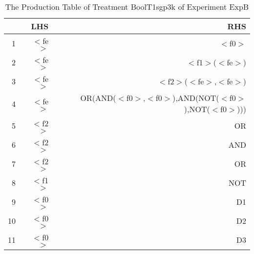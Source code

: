 \begin{table}[ht]
\centering
\begin{tabular}{rrr}
  \hline
 & LHS & RHS \\ 
  \hline
1 & $<$fe$>$ & $<$f0$>$ \\ 
  2 & $<$fe$>$ & $<$f1$>$($<$fe$>$) \\ 
  3 & $<$fe$>$ & $<$f2$>$($<$fe$>$,$<$fe$>$) \\ 
  4 & $<$fe$>$ & OR(AND($<$f0$>$,$<$f0$>$),AND(NOT($<$f0$>$),NOT($<$f0$>$))) \\ 
  5 & $<$f2$>$ & OR \\ 
  6 & $<$f2$>$ & AND \\ 
  7 & $<$f2$>$ & OR \\ 
  8 & $<$f1$>$ & NOT \\ 
  9 & $<$f0$>$ & D1 \\ 
  10 & $<$f0$>$ & D2 \\ 
  11 & $<$f0$>$ & D3 \\ 
   \hline
\end{tabular}
\caption{The Production Table of Treatment BoolT1sgp3k of Experiment ExpB} 
\end{table}
